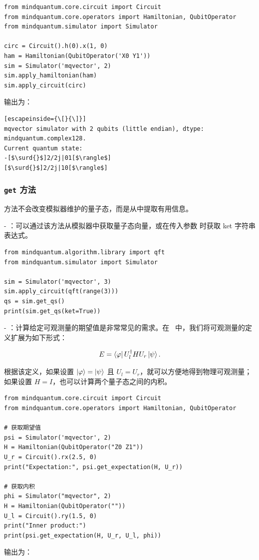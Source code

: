 \begin{lstlisting}
from mindquantum.core.circuit import Circuit
from mindquantum.core.operators import Hamiltonian, QubitOperator
from mindquantum.simulator import Simulator

circ = Circuit().h(0).x(1, 0)
ham = Hamiltonian(QubitOperator('X0 Y1'))
sim = Simulator('mqvector', 2)
sim.apply_hamiltonian(ham)
sim.apply_circuit(circ)
\end{lstlisting}
输出为：
\begin{lstlisting}[escapeinside={\[}{\]}]
mqvector simulator with 2 qubits (little endian), dtype: mindquantum.complex128.
Current quantum state:
-[$\surd{}$]2/2j|01[$\rangle$]
[$\surd{}$]2/2j|10[$\rangle$]
\end{lstlisting}

\subsubsection{\texttt{get} 方法}

 方法不会改变模拟器维护的量子态，而是从中提取有用信息。

- \getqs：可以通过该方法从模拟器中获取量子态向量，或在传入参数  时获取 ket 字符串表达式。
\begin{lstlisting}
from mindquantum.algorithm.library import qft
from mindquantum.simulator import Simulator

sim = Simulator('mqvector', 3)
sim.apply_circuit(qft(range(3)))
qs = sim.get_qs()
print(sim.get_qs(ket=True))
\end{lstlisting}

- \getexpectation：计算给定可观测量的期望值是非常常见的需求。在 \MindQuantum\ 中，我们将可观测量的定义扩展为如下形式：

\begin{equation}
    E = \bra{\varphi}U_l^\dagger H U_r \ket{\psi}.
\end{equation}

根据该定义，如果设置 $\ket{\varphi}=\ket{\psi}$ 且 $U_l = U_r$，就可以方便地得到物理可观测量；如果设置 $H=I$，也可以计算两个量子态之间的内积。

\begin{lstlisting}
from mindquantum.core.circuit import Circuit
from mindquantum.core.operators import Hamiltonian, QubitOperator

# 获取期望值
psi = Simulator('mqvector', 2)
H = Hamiltonian(QubitOperator("Z0 Z1"))
U_r = Circuit().rx(2.5, 0)
print("Expectation:", psi.get_expectation(H, U_r))

# 获取内积
phi = Simulator("mqvector", 2)
H = Hamiltonian(QubitOperator(""))
U_l = Circuit().ry(1.5, 0)
print("Inner product:")
print(psi.get_expectation(H, U_r, U_l, phi))
\end{lstlisting}
输出为：

